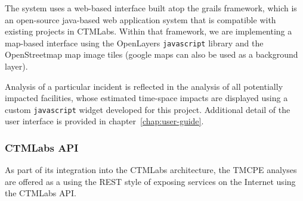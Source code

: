 \documentclass[12pt]{report}
\newcounter{time}
\newcounter{space}
\begin{document}
The system uses a web-based interface built atop the grails framework,
which is an open-source java-based web application system that is
compatible with existing projects in \ac{CTMLabs}.  Within that framework,
we are implementing a map-based interface using the OpenLayers
\texttt{javascript} library \citep{openlayers} and the OpenStreetmap map image
tiles \citep{openstreetmap} (google maps can also be used as a
background layer).

Analysis of a particular incident is reflected in the analysis of all
potentially impacted facilities, whose estimated time-space impacts
are displayed using a custom \texttt{javascript} widget developed for
this project.  Additional detail of the user interface is provided in
chapter~\ref{chap:user-guide}.





\subsubsection{CTMLabs API}
\label{sec:ctmlabs-api}

As part of its integration into the \ac{CTMLabs} architecture, the
\ac{TMCPE} analyses are offered as a using the \ac{REST} style of
exposing services on the Internet
\citep{fielding00:_archit_styles_desig_networ_softw_archit} using the
CTMLabs \ac{API}.
\end{document}
